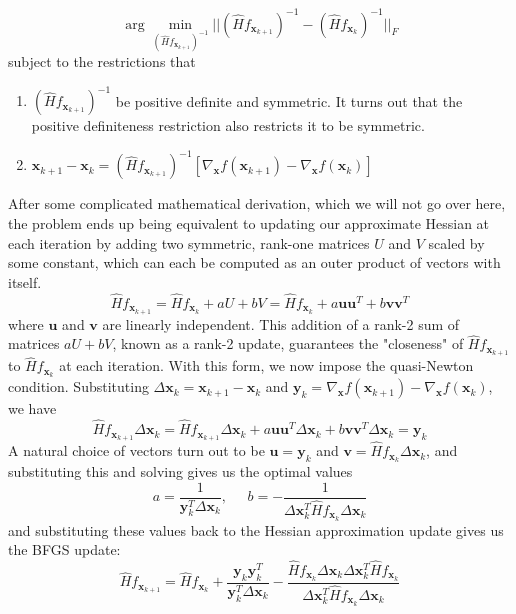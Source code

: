   \[\arg \min_{(\hat{H} f_{\mathbf{x}_{k+1}})^{-1}} ||(\hat{H} f_{\mathbf{x}_{k+1}})^{-1} - (\hat{H} f_{\mathbf{x}_{k}})^{-1} ||_F\]
  subject to the restrictions that 
  \begin{enumerate}
      \item $(\hat{H} f_{\mathbf{x}_{k+1}})^{-1}$ be positive definite and symmetric. It turns out that the positive definiteness restriction also restricts it to be symmetric. 
      \item $\mathbf{x}_{k+1} - \mathbf{x}_k = (\hat{H} f_{\mathbf{x}_{k+1}})^{-1} [\nabla_\mathbf{x} f (\mathbf{x}_{k+1}) - \nabla_\mathbf{x} f (\mathbf{x}_k)]$
  \end{enumerate}
  After some complicated mathematical derivation, which we will not go over here, the problem ends up being equivalent to updating our approximate Hessian at each iteration by adding two symmetric, rank-one matrices $U$ and $V$ scaled by some constant, which can each be computed as an outer product of vectors with itself. 
  \[\hat{H} f_{\mathbf{x}_{k+1}} = \hat{H} f_{\mathbf{x}_{k}} + a U + b V = \hat{H} f_{\mathbf{x}_{k}} + a \mathbf{u} \mathbf{u}^T + b \mathbf{v} \mathbf{v}^T\]
  where $\mathbf{u}$ and $\mathbf{v}$ are linearly independent. This addition of a rank-2 sum of matrices $a U + b V$, known as a rank-2 update, guarantees the "closeness" of $\hat{H} f_{\mathbf{x}_{k+1}}$ to $\hat{H} f_{\mathbf{x}_{k}}$ at each iteration. With this form, we now impose the quasi-Newton condition. Substituting $\Delta \mathbf{x}_k = \mathbf{x}_{k+1} - \mathbf{x}_k$ and $\mathbf{y}_k = \nabla_\mathbf{x} f (\mathbf{x}_{k+1}) - \nabla_\mathbf{x} f (\mathbf{x}_k)$, we have
  \[\hat{H} f_{\mathbf{x}_{k+1}} \Delta \mathbf{x}_k = \hat{H} f_{\mathbf{x}_{k+1}} \Delta \mathbf{x}_k + a \mathbf{u} \mathbf{u}^T \Delta \mathbf{x}_k + b \mathbf{v} \mathbf{v}^T \Delta \mathbf{x}_k = \mathbf{y}_k\]
  A natural choice of vectors turn out to be $\mathbf{u} = \mathbf{y}_k$ and $\mathbf{v} = \hat{H} f_{\mathbf{x}_{k}} \Delta \mathbf{x}_k$, and substituting this and solving gives us the optimal values 
  \[a = \frac{1}{\mathbf{y}_k^T \Delta \mathbf{x}_k}, \;\;\;\;\; b = -\frac{1}{\Delta \mathbf{x}_k^T \hat{H} f_{\mathbf{x}_{k}} \Delta \mathbf{x}_k}\]
  and substituting these values back to the Hessian approximation update gives us the BFGS update: 
  \[\hat{H} f_{\mathbf{x}_{k+1}} = \hat{H} f_{\mathbf{x}_{k}} + \frac{\mathbf{y}_k \mathbf{y}_k^T}{\mathbf{y}_k^T \Delta \mathbf{x}_k} - \frac{\hat{H} f_{\mathbf{x}_{k}} \Delta \mathbf{x}_k \Delta \mathbf{x}_k^T \hat{H} f_{\mathbf{x}_{k}}}{\Delta \mathbf{x}_k^T \hat{H} f_{\mathbf{x}_{k}} \Delta \mathbf{x}_k}\]
